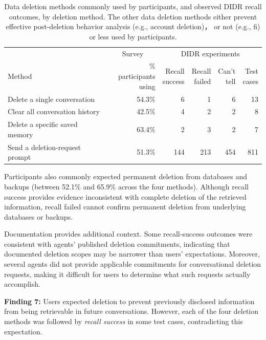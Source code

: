 \begin{table}[!t]
\centering
\caption{Data deletion methods commonly used by participants, and observed DIDR recall outcomes, by deletion method. The other data deletion methods either prevent effective post-deletion behavior analysis (e.g., account deletion)， or not (e.g., fi) or less used by participants.}
\label{tab:expectation-outcome}
\footnotesize
\setlength{\tabcolsep}{3pt}
\begin{tabularx}{\columnwidth}{@{}Xrrrrr@{}}
\toprule
& \multicolumn{1}{c}{Survey} & \multicolumn{4}{c}{DIDR experiments} \\
\cmidrule(lr){2-2}\cmidrule(lr){3-6}
Method & \makecell[r]{\% participants\\ using} & \makecell[r]{Recall\\success} & \makecell[r]{Recall\\failed} & \makecell[r]{Can't\\tell} & \makecell[r]{Test\\cases} \\
\midrule
Delete a single conversation & 54.3\% & 6 & 1 & 6 & 13 \\
Clear all conversation history & 42.5\% & 4 & 2 & 2 & 8 \\
Delete a specific saved memory & 63.4\% & 2 & 3 & 2 & 7 \\
Send a deletion-request prompt & 51.3\% & 144 & 213 & 454 & 811 \\
\bottomrule
\end{tabularx}
\end{table}

%
Participants also commonly expected permanent deletion from databases and backups (between 52.1\% and 65.9\% across the four methods).
%
Although recall success provides evidence inconsistent with complete deletion of the retrieved information, recall failed cannot confirm permanent deletion from underlying databases or backups.

%
Documentation provides additional context.
%
Some recall-success outcomes were consistent with agents' published deletion commitments, indicating that documented deletion scopes may be narrower than users' expectations.
%
Moreover, several agents did not provide applicable commitments for conversational deletion requests, making it difficult for users to determine what such requests actually accomplish.

\begin{takeawaybox}
\textbf{Finding 7:} Users expected deletion to prevent previously disclosed information from being retrievable in future conversations. However, each of the four deletion methods was followed by \textit{recall success} in some test cases, contradicting this expectation.
\end{takeawaybox}


